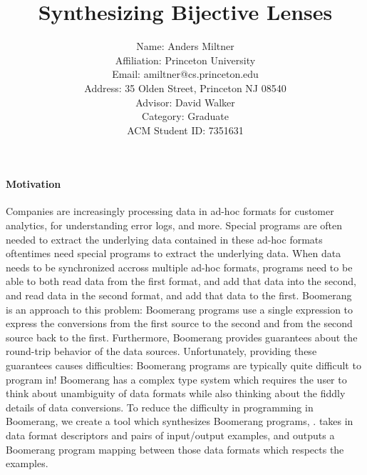 \documentclass[a4paper,twoside]{article}
\begin{document}
\setlength{\pdfpageheight}{\paperheight}
\setlength{\pdfpagewidth}{\paperwidth}

\author{
  \normalsize Name: Anders Miltner\\
  \normalsize Affiliation: Princeton University\\
  \normalsize Email: amiltner@cs.princeton.edu\\
  \normalsize Address: 35 Olden Street, Princeton NJ 08540\\
  \normalsize Advisor: David Walker\\
  \normalsize Category: Graduate\\
  \normalsize ACM Student ID: 7351631
}

\title{\Large Synthesizing Bijective Lenses}

\maketitle

\paragraph*{Motivation}
Companies are increasingly processing data in ad-hoc formats for customer
analytics, for understanding error logs, and more.
Special programs are often needed to extract the
underlying data contained in these ad-hoc formats oftentimes need special
programs to extract the underlying data.  When data needs to be synchronized
accross multiple ad-hoc formats, programs need to be able to both read data from
the first format, and add that data into the second, and read data in the second
format, and add that data to the first.  Boomerang~\cite{boomerang} is an approach
to this problem:  Boomerang programs use a single expression to express
the conversions from the first source to the second and from the second source
back to the first.  Furthermore, Boomerang provides guarantees about the
round-trip behavior of the data sources.  Unfortunately, providing these
guarantees causes difficulties: Boomerang programs are typically quite difficult
to program in!  Boomerang has a complex type system which requires the user to
think about unambiguity of data formats while also thinking about the fiddly
details of data conversions.  To reduce the difficulty in programming in
Boomerang, we create a tool which synthesizes Boomerang programs, \Optician{}.
\Optician{} takes in data format
descriptors and pairs of input/output examples, and outputs a Boomerang program
mapping between those data formats which respects the examples.
\end{document}
